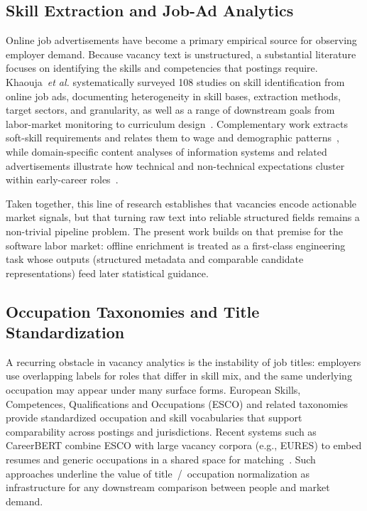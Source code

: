 \subsection{Skill Extraction and Job-Ad Analytics}
\label{sec:sota-skill-extraction}

Online job advertisements have become a primary empirical source for observing employer demand.
Because vacancy text is unstructured, a substantial literature focuses on identifying the skills and competencies that postings require.
Khaouja~\emph{et al.} systematically surveyed 108 studies on skill identification from online job ads, documenting heterogeneity in skill bases, extraction methods, target sectors, and granularity, as well as a range of downstream goals from labor-market monitoring to curriculum design~\cite{Khaouja2021}.
Complementary work extracts soft-skill requirements and relates them to wage and demographic patterns~\cite{Calanca2019}, while domain-specific content analyses of information systems and related advertisements illustrate how technical and non-technical expectations cluster within early-career roles~\cite{Kennan2008}.

Taken together, this line of research establishes that vacancies encode actionable market signals, but that turning raw text into reliable structured fields remains a non-trivial pipeline problem.
The present work builds on that premise for the software labor market: offline enrichment is treated as a first-class engineering task whose outputs (structured metadata and comparable candidate representations) feed later statistical guidance.

\subsection{Occupation Taxonomies and Title Standardization}
\label{sec:sota-taxonomies}

A recurring obstacle in vacancy analytics is the instability of job titles: employers use overlapping labels for roles that differ in skill mix, and the same underlying occupation may appear under many surface forms.
European Skills, Competences, Qualifications and Occupations (ESCO) and related taxonomies provide standardized occupation and skill vocabularies that support comparability across postings and jurisdictions.
Recent systems such as CareerBERT combine ESCO with large vacancy corpora (e.g., EURES) to embed resumes and generic occupations in a shared space for matching~\cite{Rosenberger2025}.
Such approaches underline the value of title~/~occupation normalization as infrastructure for any downstream comparison between people and market demand.

